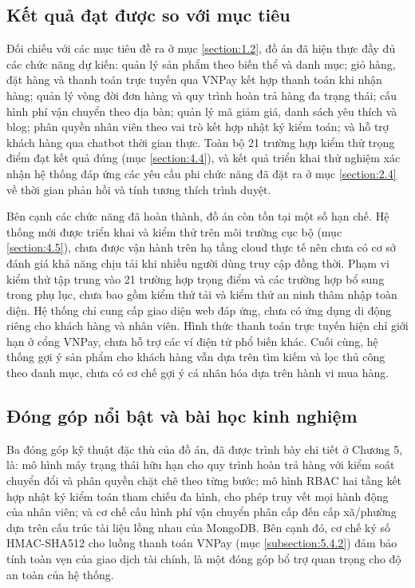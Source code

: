 \documentclass[../DoAn.tex]{subfiles}
\begin{document}
\subsection*{Kết quả đạt được so với mục tiêu}

Đối chiếu với các mục tiêu đề ra ở mục \ref{section:1.2}, đồ án đã hiện thực
đầy đủ các chức năng dự kiến: quản lý sản phẩm theo biến thể và danh mục;
giỏ hàng, đặt hàng và thanh toán trực tuyến qua VNPay kết hợp thanh toán khi
nhận hàng; quản lý vòng đời đơn hàng và quy trình hoàn trả hàng đa trạng
thái; cấu hình phí vận chuyển theo địa bàn; quản lý mã giảm giá, danh sách
yêu thích và blog; phân quyền nhân viên theo vai trò kết hợp nhật ký kiểm
toán; và hỗ trợ khách hàng qua chatbot thời gian thực. Toàn bộ 21 trường hợp
kiểm thử trọng điểm đạt kết quả đúng (mục \ref{section:4.4}), và kết quả
triển khai thử nghiệm xác nhận hệ thống đáp ứng các yêu cầu phi chức năng đã
đặt ra ở mục \ref{section:2.4} về thời gian phản hồi và tính tương thích
trình duyệt.

Bên cạnh các chức năng đã hoàn thành, đồ án còn tồn tại một số hạn chế. Hệ
thống mới được triển khai và kiểm thử trên môi trường cục bộ (mục
\ref{section:4.5}), chưa được vận hành trên hạ tầng cloud thực tế nên chưa
có cơ sở đánh giá khả năng chịu tải khi nhiều người dùng truy cập đồng thời.
Phạm vi kiểm thử tập trung vào 21 trường hợp trọng điểm và các trường hợp bổ
sung trong phụ lục, chưa bao gồm kiểm thử tải và kiểm thử an ninh thâm nhập
toàn diện. Hệ thống chỉ cung cấp giao diện web đáp ứng, chưa có ứng dụng di
động riêng cho khách hàng và nhân viên. Hình thức thanh toán trực tuyến hiện
chỉ giới hạn ở cổng VNPay, chưa hỗ trợ các ví điện tử phổ biến khác. Cuối
cùng, hệ thống gợi ý sản phẩm cho khách hàng vẫn dựa trên tìm kiếm và lọc thủ
công theo danh mục, chưa có cơ chế gợi ý cá nhân hóa dựa trên hành vi mua
hàng.

\subsection*{Đóng góp nổi bật và bài học kinh nghiệm}

Ba đóng góp kỹ thuật đặc thù của đồ án, đã được trình bày chi tiết ở Chương 5,
là: mô hình máy trạng thái hữu hạn cho quy trình hoàn trả hàng với kiểm soát
chuyển đổi và phân quyền chặt chẽ theo từng bước; mô hình RBAC hai tầng kết
hợp nhật ký kiểm toán tham chiếu đa hình, cho phép truy vết mọi hành động của
nhân viên; và cơ chế cấu hình phí vận chuyển phân cấp đến cấp xã/phường dựa
trên cấu trúc tài liệu lồng nhau của MongoDB. Bên cạnh đó, cơ chế ký số
HMAC-SHA512 cho luồng thanh toán VNPay (mục \ref{subsection:5.4.2}) đảm bảo
tính toàn vẹn của giao dịch tài chính, là một đóng góp bổ trợ quan trọng cho
độ an toàn của hệ thống.
\end{document}
